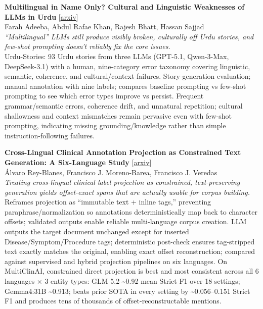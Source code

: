 \documentclass[12pt,letterpaper]{article}
\begin{document}
\medskip

{\small\textbf{Multilingual in Name Only? Cultural and Linguistic Weaknesses of LLMs in Urdu}} {\scriptsize[\href{https://arxiv.org/abs/2609.10758}{arxiv}]}\\
{\scriptsize Farah Adeeba, Abdul Rafae Khan, Rajesh Bhatt, Hassan Sajjad}\\

{\small\textit{``Multilingual'' LLMs still produce visibly broken, culturally off Urdu stories, and few-shot prompting doesn't reliably fix the core issues.}}\\[1pt]
{\footnotesize Urdu-Stories: 93 Urdu stories from three LLMs (GPT-5.1, Qwen-3-Max, DeepSeek-3.1) with a human, nine-category error taxonomy covering linguistic, semantic, coherence, and cultural/context failures. Story-generation evaluation; manual annotation with nine labels; compares baseline prompting vs few-shot prompting to see which error types improve vs persist. Frequent grammar/semantic errors, coherence drift, and unnatural repetition; cultural shallowness and context mismatches remain pervasive even with few-shot prompting, indicating missing grounding/knowledge rather than simple instruction-following failures.}

\medskip

{\small\textbf{Cross-Lingual Clinical Annotation Projection as Constrained Text Generation: A Six-Language Study}} {\scriptsize[\href{https://arxiv.org/abs/2609.11450}{arxiv}]}\\
{\scriptsize \'Alvaro Rey-Blanes, Francisco J. Moreno-Barea, Francisco J. Veredas}\\

{\small\textit{Treating cross-lingual clinical label projection as constrained, text-preserving generation yields offset-exact spans that are actually usable for corpus building.}}\\[1pt]
{\footnotesize Reframes projection as ``immutable text + inline tags,'' preventing paraphrase/normalization so annotations deterministically map back to character offsets; validated outputs enable reliable multi-language corpus creation. LLM outputs the target document unchanged except for inserted Disease/Symptom/Procedure tags; deterministic post-check ensures tag-stripped text exactly matches the original, enabling exact offset reconstruction; compared against supervised and hybrid projection pipelines on six languages. On MultiClinAI, constrained direct projection is best and most consistent across all 6 languages × 3 entity types: GLM 5.2 \textasciitilde{}0.92 mean Strict F1 over 18 settings; Gemma4:31B \textasciitilde{}0.913; beats prior SOTA in every setting by \textasciitilde{}0.056--0.151 Strict F1 and produces tens of thousands of offset-reconstructable mentions.}
\end{document}
